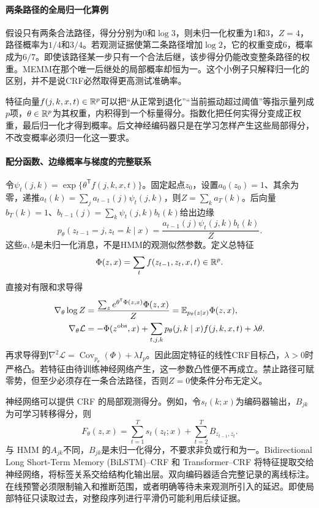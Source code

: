 \paragraph{两条路径的全局归一化算例}
假设只有两条合法路径，得分分别为0和$\log3$，则未归一化权重为1和3，$Z=4$，路径概率为$1/4$和$3/4$。若观测证据使第二条路径增加$\log2$，它的权重变成6，概率成为$6/7$。即使该路径某一步只有一个合法后继，该步得分仍能改变整条路径的权重。MEMM在那个唯一后继处的局部概率却恒为一。这个小例子只解释归一化的区别，并不是说CRF必然取得更高测试准确率。

特征向量$f(j,k,x,t)\in\mathbb{R}^p$可以把“从正常到退化”“当前振动超过阈值”等指示量列成$p$项，$\theta\in\mathbb{R}^p$为其权重，内积得到一个标量得分。指数化把任何实得分变成正权重，最后归一化才得到概率。后文神经编码器只是在学习怎样产生这些局部得分，不改变概率必须归一化这一要求。

\paragraph{配分函数、边缘概率与梯度的完整联系}
令$\psi_t(j,k)=\exp\{\theta^{\mathsf T}f(j,k,x,t)\}$。固定起点$z_0$，设置$a_0(z_0)=1$、其余为零，递推$a_t(k)=\sum_ja_{t-1}(j)\psi_t(j,k)$，则$Z=\sum_ka_T(k)$。后向量$b_T(k)=1$、$b_{t-1}(j)=\sum_k\psi_t(j,k)b_t(k)$给出边缘
\begin{equation}
 p_\theta(z_{t-1}=j,z_t=k\mid x)
 =\frac{a_{t-1}(j)\psi_t(j,k)b_t(k)}{Z}.
\end{equation}
这些$a,b$是未归一化消息，不是HMM的观测似然参数。定义总特征
\begin{equation}
 \Phi(z,x)=\sum_tf(z_{t-1},z_t,x,t)\in\mathbb{R}^p.
\end{equation}
直接对有限和求导得
\begin{align}
 \nabla_\theta\log Z
 &=\frac{\sum_z e^{\theta^{\mathsf T}\Phi(z,x)}\Phi(z,x)}{Z}
 =\mathbb{E}_{p_\theta(z\mid x)}\Phi(z,x),\\
 \nabla_\theta\mathcal L
 &=-\Phi(z^{\rm obs},x)+\sum_{t,j,k}p_\theta(j,k\mid x)f(j,k,x,t)+\lambda\theta.
\end{align}
再求导得到$\nabla^2\mathcal L=\operatorname{Cov}_{p_\theta}(\Phi)+\lambda I_p$。因此固定特征的线性CRF目标凸，$\lambda>0$时严格凸。若特征由待训练神经网络产生，这一参数凸性便不再成立。禁止路径可赋零势，但至少必须存在一条合法路径，否则$Z=0$使条件分布无定义。

神经网络可以提供 CRF 的局部观测得分。例如，令$s_t(k;x)$为编码器输出，$B_{jk}$为可学习转移得分，则
\begin{equation}
 F_\theta(z,x)=\sum_{t=1}^{T}s_t(z_t;x)+\sum_{t=2}^{T}B_{z_{t-1},z_t}.
\end{equation}
与 HMM 的$A_{jk}$不同，$B_{jk}$是未归一化得分，不要求非负或行和为一。Bidirectional Long Short-Term Memory (BiLSTM)--CRF 和 Transformer--CRF 将特征提取交给神经网络，将标签关系交给结构化输出层。双向编码器适合完整记录的离线标注。在线预警必须限制输入和推断范围，或者明确等待未来观测所引入的延迟。即使局部特征只读取过去，对整段序列进行平滑仍可能利用后续证据。

